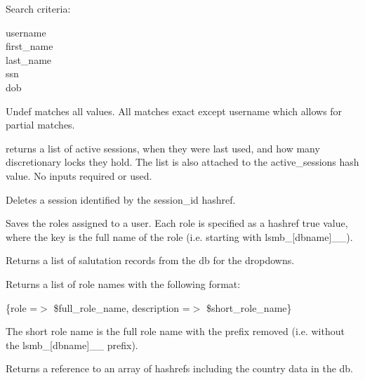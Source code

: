 \begin{description}
\begin{description}
\begin{description}
\begin{description}
\begin{description}
\begin{description}
\begin{description}
\begin{description}
\begin{description}
\begin{description}
Search criteria:

\begin{description}

\item[{username}] \mbox{}
\item[{first\_name}] \mbox{}
\item[{last\_name}] \mbox{}
\item[{ssn}] \mbox{}
\item[{dob}] \mbox{}\end{description}


Undef matches all values.  All matches exact except username which allows for
partial matches.


\item[{list\_sessions}] \mbox{}

returns a list of active sessions, when they were last used, and how many 
discretionary locks they hold.  The list is also attached to the
active\_sessions hash value.  No inputs required or used.


\item[{delete\_session}] \mbox{}

Deletes a session identified by the session\_id hashref.


\item[{save\_roles}] \mbox{}

Saves the roles assigned to a user.
Each role is specified as a hashref true value, where the key is the full name
of the role (i.e. starting with lsmb\_[dbname]\_\_).


\item[{get\_salutations}] \mbox{}

Returns a list of salutation records from the db for the dropdowns.


\item[{get\_roles}] \mbox{}

Returns a list of role names with the following format:



\{role =$>$ \$full\_role\_name, description =$>$ \$short\_role\_name\}



The short role name is the full role name with the prefix removed (i.e. without
the lsmb\_[dbname]\_\_ prefix).


\item[{get\_countries}] \mbox{}

Returns a reference to an array of hashrefs including the country data in the db.




\end{description}
\end{description}
\end{description}
\end{description}
\end{description}
\end{description}
\end{description}
\end{description}
\end{description}
\end{description}
